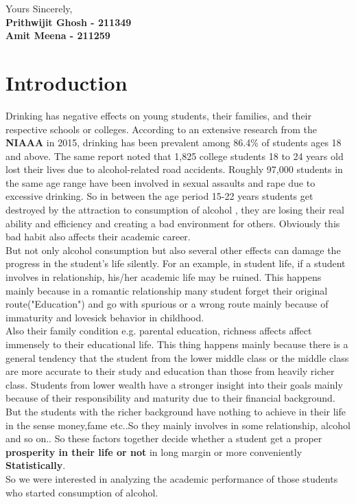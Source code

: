 \documentclass[A4paper,11pt]{report}
\begin{document}
	
	\begin{flushright}
		Yours Sincerely,\\
		\textbf{Prithwijit Ghosh - 211349}\\
		\textbf{Amit Meena - 211259}
	\end{flushright}
	
	\tableofcontents
	\listoftables
	\listoffigures
	\newpage
	\section{Introduction}
	Drinking has negative effects on young students, their families, and their respective schools or colleges. According to an extensive research from the \textbf{NIAAA} in 2015, drinking has been prevalent among 86.4\% of students ages 18 and above. The same report noted that 1,825 college students 18 to 24 years old lost their lives due to alcohol-related road accidents. Roughly 97,000 students in the same age range have been involved in sexual assaults and rape due to excessive drinking. So in between the age period 15-22 years students get destroyed by the attraction to consumption of alcohol , they are losing their real ability and efficiency and creating a bad environment for others. Obviously this bad habit also affects their academic career.\\
	But not only alcohol consumption but also several other effects can damage the progress in the student's life silently. For an example, in student life, if a student involves in relationship, his/her academic life may be ruined. This happens mainly because in a romantic relationship many student forget their original route("Education") and go with spurious or a wrong route mainly because of immaturity and lovesick behavior in childhood.\\
	Also their family condition e.g. parental education, richness affects affect immensely to their educational life. This thing happens mainly because there is a general tendency that the student from the lower middle class or the middle class are more accurate to their study and education than those from heavily richer class. Students from lower wealth have a stronger insight into their goals mainly because of their responsibility and maturity due to their financial background. But the students with the richer background have nothing to achieve in their life in the sense money,fame etc..So they mainly involves in some relationship, alcohol and so on.. So these factors together decide whether a student get a proper\textbf{ prosperity in their life or not} in long margin or more conveniently \textbf{Statistically}.\\
	So we were interested in analyzing the academic performance of those students who started consumption of alcohol.
	
\end{document}
